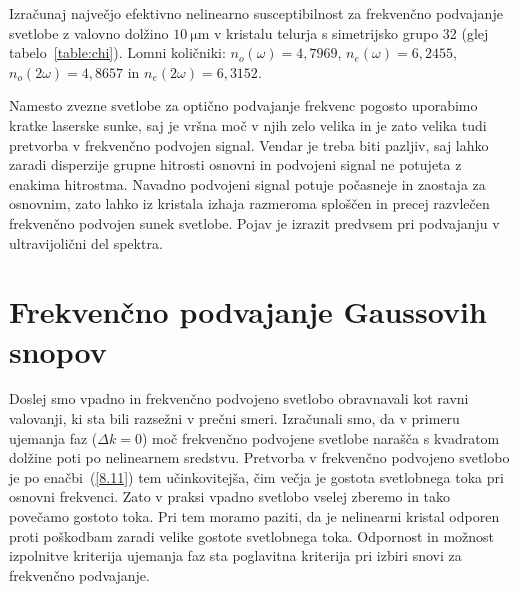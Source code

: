 \begin{definition}
Izračunaj največjo efektivno nelinearno susceptibilnost za
frekvenčno podvajanje svetlobe z valovno
dolžino $10~\si{\micro\metre}$ v kristalu telurja s simetrijsko grupo 32 (glej tabelo~\ref{table:chi}). 
Lomni količniki: $n_o(\omega) = 4,7969$, 
$n_e(\omega) = 6,2455$, $n_o(2\omega) = 4,8657$ in $n_e(2\omega) = 6,3152$.
\end{definition}

\begin{remark}
Namesto zvezne svetlobe za optično podvajanje frekvenc pogosto uporabimo kratke laserske sunke, saj je 
vršna moč v njih zelo velika in je zato velika tudi pretvorba v frekvenčno podvojen signal.
Vendar je treba biti pazljiv, saj lahko zaradi disperzije grupne hitrosti osnovni in 
podvojeni signal ne potujeta z enakima hitrostma. Navadno podvojeni signal potuje 
počasneje in zaostaja za osnovnim, zato lahko iz kristala izhaja razmeroma sploščen in 
precej razvlečen frekvenčno podvojen sunek svetlobe. Pojav je izrazit predvsem pri podvajanju v
ultravijolični del spektra.
\end{remark}

\section{Frekvenčno podvajanje Gaussovih snopov}
Doslej smo vpadno in frekvenčno podvojeno svetlobo obravnavali kot ravni valovanji,
ki sta bili razsežni v prečni smeri. Izračunali smo, da v primeru 
ujemanja faz ($\Delta k=0$)
moč frekvenčno podvojene svetlobe narašča s kvadratom dolžine poti po nelinearnem
sredstvu. Pretvorba v frekvenčno podvojeno svetlobo je po enačbi~(\ref{8.11}) tem
učinkovitejša, čim večja je gostota svetlobnega toka pri osnovni frekvenci.
Zato v praksi vpadno svetlobo vselej zberemo in tako povečamo gostoto toka. 
Pri tem moramo paziti, da je nelinearni kristal odporen proti poškodbam
zaradi velike gostote svetlobnega toka. Odpornost in možnost izpolnitve kriterija ujemanja 
faz sta poglavitna kriterija pri izbiri snovi za frekvenčno podvajanje. 

